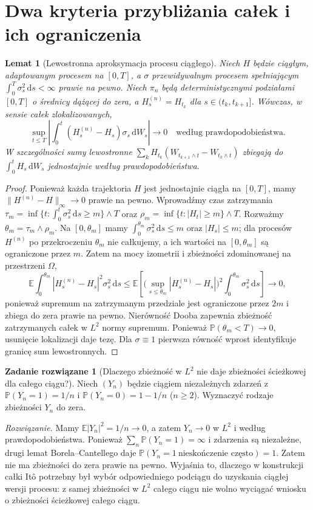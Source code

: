 \documentclass[11pt,a4paper,oneside]{report}
\numberwithin{equation}{chapter}
\theoremstyle{plain}
\newtheorem{lemat}[twierdzenie]{Lemat}
\theoremstyle{definition}
\newtheorem{zadanie}{Zadanie rozwiązane}[chapter]
\theoremstyle{remark}
\newcommand{\Prob}{\mathbb{P}}
\newcommand{\E}{\mathbb{E}}
\newcommand{\dd}{\mathrm{d}}
\newcommand{\norm}[1]{\lVert #1\rVert}
\begin{document}
\section{Dwa kryteria przybliżania całek i ich ograniczenia}\label{sec:volIII:02:09}
\begin{lemat}[Lewostronna aproksymacja procesu ciągłego]\label{lem:volIII:02:04}
\label{lem:step-approx-ito}
Niech $H$ będzie ciągłym, adaptowanym procesem na
$[0,T]$, a $\sigma$ przewidywalnym procesem spełniającym
$\int_0^T\sigma_s^2\,\dd s<\infty$ prawie na pewno.
Niech $\pi_n$ będą deterministycznymi podziałami
$[0,T]$ o średnicy dążącej do zera, a
$H_s^{(n)}=H_{t_k}$ dla $s\in(t_k,t_{k+1}]$.
Wówczas, w sensie całek zlokalizowanych,
\[
\sup_{t\le T}\left|
\int_0^t(H_s^{(n)}-H_s)\sigma_s\,\dd W_s\right|
\longrightarrow0\quad\text{według prawdopodobieństwa}.
\]
W szczególności sumy lewostronne
$\sum_kH_{t_k}(W_{t_{k+1}\wedge t}-W_{t_k\wedge t})$
zbiegają do $\int_0^tH_s\,\dd W_s$ jednostajnie
według prawdopodobieństwa.
\end{lemat}
\begin{proof}
Ponieważ każda trajektoria $H$ jest jednostajnie
ciągła na $[0,T]$, mamy
$\norm{H^{(n)}-H}_\infty\to0$ prawie na pewno.
Wprowadźmy czas zatrzymania
$\tau_m=\inf\{t:\int_0^t\sigma_s^2\,\dd s\ge m\}
\wedge T$ oraz $\rho_m=\inf\{t:|H_t|\ge m\}\wedge T$.
Rozważmy $\theta_m=\tau_m\wedge\rho_m$.
Na $[0,\theta_m]$ mamy
$\int_0^{\theta_m}\sigma_s^2\,\dd s\le m$ oraz
$|H_s|\le m$; dla procesów $H^{(n)}$ po przekroczeniu
$\theta_m$ nie całkujemy, a ich wartości na
$[0,\theta_m]$ są ograniczone przez $m$.
Zatem na mocy izometrii i zbieżności zdominowanej
na przestrzeni $\Omega$,
\[
\E\int_0^{\theta_m}|H_s^{(n)}-H_s|^2
\sigma_s^2\,\dd s
\le \E\left[
\Big(\sup_{s\le\theta_m}|H_s^{(n)}-H_s|\Big)^2
\int_0^{\theta_m}\sigma_s^2\,\dd s\right]\longrightarrow0,
\]
ponieważ supremum na zatrzymanym przedziale jest
ograniczone przez $2m$ i zbiega do zera prawie na pewno.
Nierówność Dooba zapewnia
zbieżność zatrzymanych całek w $L^2$ normy supremum.
Ponieważ $\Prob(\theta_m<T)\to0$, usunięcie
lokalizacji daje tezę. Dla $\sigma\equiv1$
pierwsza równość wprost identyfikuje granicę
sum lewostronnych.
\end{proof}

\begin{zadanie}[Dlaczego zbieżność w $L^2$ nie daje zbieżności
ścieżkowej dla całego ciągu?]
Niech $(Y_n)$ będzie ciągiem niezależnych zdarzeń
z $\Prob(Y_n=1)=1/n$ i $\Prob(Y_n=0)=1-1/n$
($n\ge2$). Wyznaczyć rodzaje zbieżności $Y_n$ do zera.

\emph{Rozwiązanie.} Mamy $\E|Y_n|^2=1/n\to0$,
a zatem $Y_n\to0$ w $L^2$ i według prawdopodobieństwa.
Ponieważ $\sum_n\Prob(Y_n=1)=\infty$ i zdarzenia są
niezależne, drugi lemat Borela--Cantellego daje
$\Prob(Y_n=1\ \text{nieskończenie często})=1$.
Zatem nie ma zbieżności do zera prawie na pewno.
Wyjaśnia to, dlaczego w konstrukcji całki Itô potrzebny
był wybór odpowiedniego podciągu do uzyskania ciągłej
wersji procesu: z samej zbieżności w $L^2$ całego
ciągu nie wolno wyciągać wniosku o zbieżności
ścieżkowej całego ciągu.
\end{zadanie}
\end{document}
